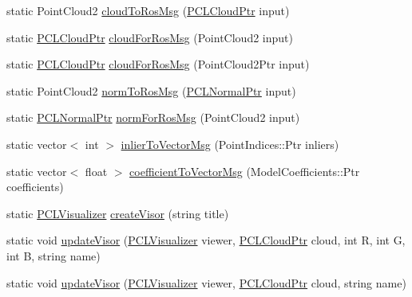 \begin{DoxyCompactItemize}
\item 
static Point\-Cloud2 \hyperlink{classpcm_1_1PCManager_a9ec6cf99c0c34c9761fd923aace594dc}{cloud\-To\-Ros\-Msg} (\hyperlink{PCPrimitive_8h_aa14a240c8d999c4f56133c0f70e88783}{P\-C\-L\-Cloud\-Ptr} input)
\item 
static \hyperlink{PCPrimitive_8h_aa14a240c8d999c4f56133c0f70e88783}{P\-C\-L\-Cloud\-Ptr} \hyperlink{classpcm_1_1PCManager_acb513ed7a3b898e398fd211bafac6f6a}{cloud\-For\-Ros\-Msg} (Point\-Cloud2 input)
\item 
static \hyperlink{PCPrimitive_8h_aa14a240c8d999c4f56133c0f70e88783}{P\-C\-L\-Cloud\-Ptr} \hyperlink{classpcm_1_1PCManager_aea4756e187ee152c8695dc3e7496562e}{cloud\-For\-Ros\-Msg} (Point\-Cloud2\-Ptr input)
\item 
static Point\-Cloud2 \hyperlink{classpcm_1_1PCManager_aad8d4dd6c1bb761213134760be5673c3}{norm\-To\-Ros\-Msg} (\hyperlink{PCPrimitive_8h_a1bc38ce8b0c26e5f2d28fae9f3e3ea97}{P\-C\-L\-Normal\-Ptr} input)
\item 
static \hyperlink{PCPrimitive_8h_a1bc38ce8b0c26e5f2d28fae9f3e3ea97}{P\-C\-L\-Normal\-Ptr} \hyperlink{classpcm_1_1PCManager_a75f790855ce87d24293bb3a8e4a453c9}{norm\-For\-Ros\-Msg} (Point\-Cloud2 input)
\item 
static vector$<$ int $>$ \hyperlink{classpcm_1_1PCManager_ab473f60dc622465a1c3ff77000f0803f}{inlier\-To\-Vector\-Msg} (Point\-Indices\-::\-Ptr inliers)
\item 
static vector$<$ float $>$ \hyperlink{classpcm_1_1PCManager_a79353f94b8396268bea0a1358c260421}{coefficient\-To\-Vector\-Msg} (Model\-Coefficients\-::\-Ptr coefficients)
\item 
static \hyperlink{PCManager_8h_a38c805dbc7ad6f06109b85c8e540817a}{P\-C\-L\-Visualizer} \hyperlink{classpcm_1_1PCManager_a23d8e95e891a3330785375e6672ec1fe}{create\-Visor} (string title)
\item 
static void \hyperlink{classpcm_1_1PCManager_a8b6dfcce0709c29f63a82c4dfa6ef6e6}{update\-Visor} (\hyperlink{PCManager_8h_a38c805dbc7ad6f06109b85c8e540817a}{P\-C\-L\-Visualizer} viewer, \hyperlink{PCPrimitive_8h_aa14a240c8d999c4f56133c0f70e88783}{P\-C\-L\-Cloud\-Ptr} cloud, int R, int G, int B, string name)
\item 
static void \hyperlink{classpcm_1_1PCManager_af6498d518bd4eb1ad5f724849a851e90}{update\-Visor} (\hyperlink{PCManager_8h_a38c805dbc7ad6f06109b85c8e540817a}{P\-C\-L\-Visualizer} viewer, \hyperlink{PCPrimitive_8h_aa14a240c8d999c4f56133c0f70e88783}{P\-C\-L\-Cloud\-Ptr} cloud, string name)
\item 

\end{DoxyCompactItemize}
